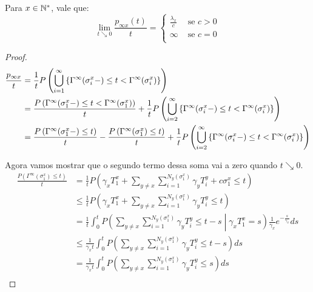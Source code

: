 \begin{proposicao}
  Para $x \in {\mathbb{N^*}}$, vale que:
  \label{prop:taxa-inf-x}
  \begin{displaymath}
    \lim_{t \searrow 0} \frac{p_{\infty x}(t)}{t} = \begin{cases}
      \frac{\lambda_x}{c} & \textrm{ se } c > 0 \\
      \infty & \textrm{ se } c = 0 \\
    \end{cases}
  \end{displaymath}
\end{proposicao}
\begin{proof}
  \begin{align}
    \frac{p_{\infty x}}{t} &= \frac{1}{t} P \left( \bigcup_{i =
        1}^{\infty} \left\{ \Gamma^\infty (\sigma^x_i -) \leq t <
        \Gamma^\infty(\sigma^x_i) \right\} \right) \notag \\
    &= \frac{P \left( \Gamma^\infty (\sigma^x_1 -) \leq t <
      \Gamma^\infty(\sigma^x_1) \right)}{t} +
    \frac{1}{t} P \left( \bigcup_{i =
        2}^{\infty} \left\{ \Gamma^\infty (\sigma^x_i -) \leq t <
        \Gamma^\infty(\sigma^x_i) \right\} \right) \notag \notag \\
    \label{erros_taxa_inf}
    &= \frac{P \left( \Gamma^\infty (\sigma^x_1 -) \leq t \right)}{t} -
    \frac{P \left( \Gamma^\infty (\sigma^x_1) \leq t \right)}{t} +
    \frac{1}{t} P \left( \bigcup_{i =
        2}^{\infty} \left\{ \Gamma^\infty (\sigma^x_i -) \leq t <
        \Gamma^\infty(\sigma^x_i) \right\} \right)
  \end{align}

  Agora vamos mostrar que o segundo termo dessa soma vai a zero quando
  $t \searrow 0$.
  \begin{align*}
    \frac{P (\Gamma^\infty (\sigma^x_1) \leq t)}{t}
    &= \frac{1}{t} P \left(
      \gamma_x T^x_1 + 
      \sum_{y \neq x} \sum_{i = 1}^{N_y (\sigma^x_1)} \gamma_y T^y_i +
      c\sigma^x_1
      \leq t
    \right) \\
    &\leq \frac{1}{t} P \left(
      \gamma_x T^x_1 + 
      \sum_{y \neq x} \sum_{i = 1}^{N_y (\sigma^x_1)} \gamma_y T^y_i
      \leq t
    \right)\\
    &= \frac{1}{t} \int_0^t P \left(
      \sum_{y \neq x} \sum_{i = 1}^{N_y (\sigma^x_1)} \gamma_y T^y_i
      \leq t - s
      \middle\vert \gamma_x T^x_1 = s
    \right) \frac{1}{\gamma_x} e^{-\frac{s}{\gamma_x}} ds\\
    &\leq \frac{1}{\gamma_x t} \int_0^t P \left(
      \sum_{y \neq x} \sum_{i = 1}^{N_y (\sigma^x_1)} \gamma_y T^y_i
      \leq t - s
    \right) ds\\
    &= \frac{1}{\gamma_x t} \int_0^t P \left(
      \sum_{y \neq x} \sum_{i = 1}^{N_y (\sigma^x_1)} \gamma_y T^y_i
      \leq s
    \right) ds\\
  \end{align*}


\end{proof}
